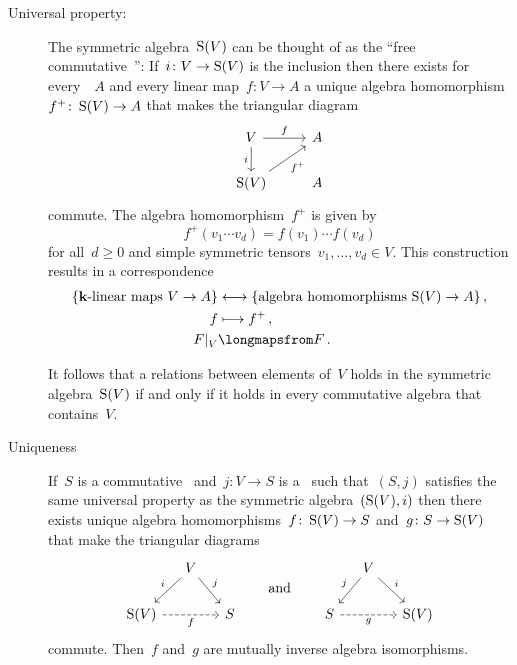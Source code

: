 \begin{recall}
\begin{description}
    \item[Universal property:]
      The symmetric algebra~$\operatorname{S}(V)$ can be thought of as the \enquote{free commutative~{\algebra{$\kf$}}}:
      If~$i \colon V \to \operatorname{S}(V)$ is the inclusion then there exists for every~{\algebra{$\kf$}}~$A$ and every linear map~$f \colon V \to A$ a unique algebra homomorphism~$f^+ \colon \operatorname{S}(V) \to A$ that makes the triangular diagram
      \[
        \begin{tikzcd}
          V
          \arrow{r}[above]{f}
          \arrow{d}[left]{i}
          &
          A
          \\
          \Symm(V)
          \arrow{ur}[below right]{f^+}
          &
          A
        \end{tikzcd}
      \]
      commute.
      The algebra homomorphism~$f^+$ is given by
      \[
        f^+(v_1 \dotsm v_d)
        =
        f(v_1) \dotsm f(v_d)
      \]
      for all~$d \geq 0$ and simple symmetric tensors~$v_1, \dotsc, v_d \in V$.
      This construction results in a {\onetoone} correspondence
      \begin{align*}
        \{ \text{\linear{$\kf$} maps~$V \to A$} \}
        &\longonetoone
        \{ \text{algebra homomorphisms~$\Symm(V) \to A$} \} \,,
        \\
        f
        &\longmapsto
        f^+ \,,
        \\
        \restrict{F}{V}
        &\longmapsfrom
        F \,.
      \end{align*}
      
      It follows that a relations between elements of~$V$ holds in the symmetric algebra~$\operatorname{S}(V)$ if and only if it holds in every commutative algebra that contains~$V$.
      
    \item[Uniqueness]
      If~$S$ is a commutative~{\algebra{$\kf$}} and~$j \colon V \to S$ is a~{\linear{$\kf$}} such that~$(S, j)$ satisfies the same universal property as the symmetric algebra~$(\operatorname{S}(V), i)$  then there exists unique algebra homomorphisms~$f \colon \operatorname{S}(V) \to S$ and~$g \colon S \to \operatorname{S}(V)$ that make the triangular diagrams
      \[
        \begin{tikzcd}[column sep = small]
          {}
          &
          V
          \arrow{dl}[above left]{i}
          \arrow{dr}[above right]{j}
          &
          {}
          \\
          \Symm(V)
          \arrow[dashed]{rr}[below]{f}
          &
          {}
          &
          S
        \end{tikzcd}
        \qquad\text{and}\qquad
        \begin{tikzcd}[column sep = small]
          {}
          &
          V
          \arrow{dl}[above left]{j}
          \arrow{dr}[above right]{i}
          &
          {}
          \\
          S
          \arrow[dashed]{rr}[below]{g}
          &
          {}
          &
          \Symm(V)
        \end{tikzcd}
      \]
      commute.
      Then~$f$ and~$g$ are mutually inverse algebra isomorphisms.
      

\end{description}
\end{recall}
